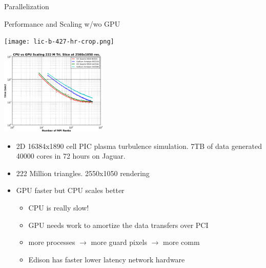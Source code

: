 \documentclass[notes]{beamer}
\begin{document}
\begin{frame}{Parallelization}
    \vspace{-0.1in}
    \begin{beamerboxesrounded}{Performance and Scaling w/wo GPU}
    \begin{center}
    \texttt{[image: lic-b-427-hr-crop.png]}
    \end{center}
    \vspace{-0.1in}
    \begin{minipage}{0.45\linewidth}
    \begin{center}
    \includegraphics[width=2in]{scaling-ce-slice-gpu.png}
    \end{center}
    \end{minipage}
    \begin{minipage}{0.45\linewidth}
    \begin{itemize}
     \setlength{\itemindent}{-1em}
     \scriptsize
     \item 2D 16384x1890 cell PIC plasma turbulence simulation. 7TB of data generated 40000 cores in 72 hours on Jaguar.
     \item 222 Million triangles. 2550x1050 rendering
     \item GPU faster but CPU scales better
     \begin{itemize}
     \setlength{\itemindent}{-3em}
     \scriptsize
     \item CPU is really slow!
     \item GPU needs work to amortize the data transfers over PCI
     \item more processes $\rightarrow$ more guard pixels $\rightarrow$ more comm
     \item Edison has faster lower latency network hardware
    \end{itemize}
    \end{itemize}
    \end{minipage}
    \end{beamerboxesrounded}
\end{frame}
\end{document}
